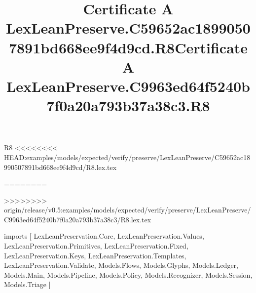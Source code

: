 \begin{lexlean}{R8}
<<<<<<<< HEAD:examples/models/expected/verify/preserve/LexLeanPreserve/C59652ac18990507891bd668ee9f4d9cd/R8.lex.tex
\title{Certificate A LexLeanPreserve.C59652ac18990507891bd668ee9f4d9cd.R8}
========
\title{Certificate A LexLeanPreserve.C9963ed64f5240b7f0a20a793b37a38c3.R8}
>>>>>>>> origin/release/v0.5:examples/models/expected/verify/preserve/LexLeanPreserve/C9963ed64f5240b7f0a20a793b37a38c3/R8.lex.tex
\begin{coremodule}
imports [
  LexLeanPreservation.Core,
  LexLeanPreservation.Values,
  LexLeanPreservation.Primitives,
  LexLeanPreservation.Fixed,
  LexLeanPreservation.Keys,
  LexLeanPreservation.Templates,
  LexLeanPreservation.Validate,
  Models.Flows,
  Models.Glyphs,
  Models.Ledger,
  Models.Main,
  Models.Pipeline,
  Models.Policy,
  Models.Recognizer,
  Models.Session,
  Models.Triage
]


\end{coremodule}
\end{lexlean}
